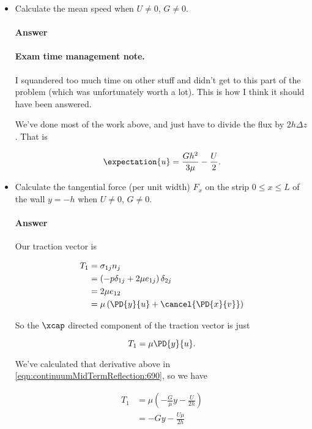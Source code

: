 \begin{itemize}
\item Calculate the mean speed when $U \ne 0$, $G \ne 0$.
\paragraph{Answer}

\paragraph{Exam time management note.}  I squandered too much time on other stuff and didn't get to this part of the problem (which was unfortunately worth a lot).  This is how I think it should have been answered.

We've done most of the work above, and just have to divide the flux by $2 h \Delta z$.  That is

\begin{equation}\label{eqn:continuumMidTermReflection:770}
\expectation{u} = \frac{G h^2}{3 \mu} - \frac{U}{2}.
\end{equation}

\item Calculate the tangential force (per unit width) $F_x$ on the strip $0 \le x \le L$ of the wall $y = -h$ when $U \ne 0$, $G \ne 0$.
\paragraph{Answer}

Our traction vector is

\begin{align*}
T_1 
&= \sigma_{1j} n_j \\
&= \left( -p \delta_{1j} + 2 \mu e_{1j} \right) \delta_{2j} \\
&= 2 \mu e_{12} \\
&= \mu \left( 
\PD{y}{u}
+
\cancel{\PD{x}{v}}
\right)
\end{align*}

So the $\xcap$ directed component of the traction vector is just

\begin{equation}\label{eqn:continuumMidTermReflection:790}
T_1 = \mu \PD{y}{u}.
\end{equation}

We've calculated that derivative above in \ref{eqn:continuumMidTermReflection:690}, so we have

\begin{align*}
T_1 
&= \mu \left( -\frac{G}{\mu} y - \frac{U}{2 h} \right) \\
&= - G y - \frac{U \mu}{2 h} 
\end{align*}


\end{itemize}
